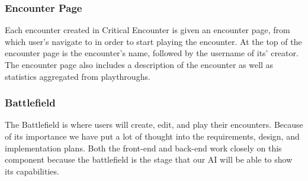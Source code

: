 \documentclass[letterpaper, 10 pt, conference]{ieeeconf}
\begin{document}
\subsubsection{Encounter Page}
Each encounter created in Critical Encounter is given an encounter page, from
which user’s navigate to in order to start playing the encounter. At the top of the
encounter page is the encounter’s name, followed by the username of its’ creator. The encounter page also includes a description of the encounter as well as statistics aggregated from playthroughs.
\subsubsection{Battlefield}
The Battlefield is where users will create, edit,
and play their encounters. Because of its importance we have put a lot of thought
into the requirements, design, and implementation plans. Both the front-end and
back-end work closely on this component because the battlefield is the stage
that our AI will be able to show its capabilities.
\end{document}
